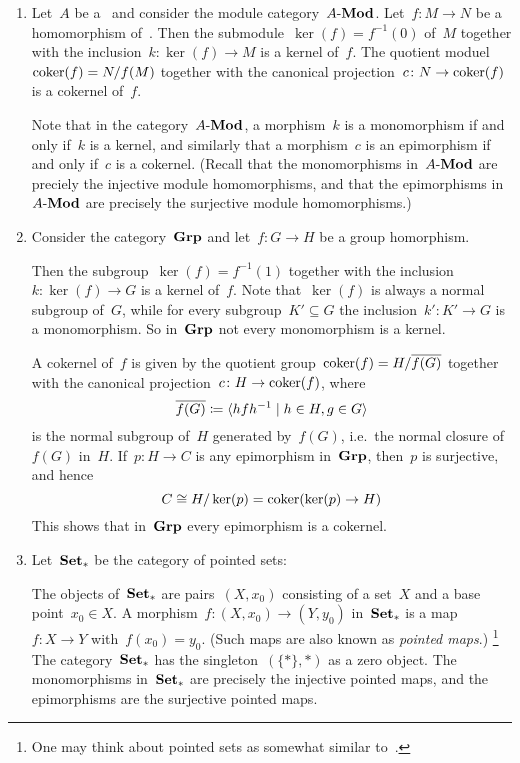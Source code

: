 \begin{example}
  \leavevmode
  \begin{enumerate}
    \item
      Let~$A$ be a~{\kalg} and consider the module category~$\text{$A$-$\mathbf{Mod}$}$.
      Let~$f \colon M \to N$ be a homomorphism of~{}.
      Then the submodule~$\ker(f) = f^{-1}(0)$ of~$M$ together with the inclusion~$k \colon \ker(f) \to M$ is a kernel of~$f$.
      The quotient moduel~$\operatorname{coker}(f) = N/f(M)$ together with the canonical projection~$c \colon N \to \operatorname{coker}(f)$ is a cokernel of~$f$.
      
      Note that in the category~$\text{$A$-$\mathbf{Mod}$}$, a morphism~$k$ is a monomorphism if and only if~$k$ is a kernel, and similarly that a morphism~$c$ is an epimorphism if and only if~$c$ is a cokernel.
      (Recall that the monomorphisms in~$\text{$A$-$\mathbf{Mod}$}$ are preciely the injective module homomorphisms, and that the epimorphisms in~$\text{$A$-$\mathbf{Mod}$}$ are precisely the surjective module homomorphisms.)
    \item
      Consider the category~$\mathbf{Grp}$ and let~$f \colon G \to H$ be a group homorphism.
      
      Then the subgroup~$\ker(f) = f^{-1}(1)$ together with the inclusion~$k \colon \ker(f) \to G$ is a kernel of~$f$.
      Note that~$\ker(f)$ is always a normal subgroup of~$G$, while for every subgroup~$K' \subseteq G$ the inclusion~$k' \colon K' \to G$ is a monomorphism.
      So in~$\mathbf{Grp}$ not every monomorphism is a kernel.
      
      A cokernel of~$f$ is given by the quotient group~$\operatorname{coker}(f) = H/\overline{f(G)}$ together with the canonical projection~$c \colon H \to \operatorname{coker}(f)$, where
      \[
                  \closure{f(G)}
        \defined  \gen{
                    h f h^{-1}
                  \suchthat
                    h \in H, g \in G
                  }
      \]
      is the normal subgroup of~$H$ generated by~$f(G)$, i.e.\ the normal closure of~$f(G)$ in~$H$.
      If~$p \colon H \to C$ is any epimorphism in~$\mathbf{Grp}$, then~$p$ is surjective, and hence
      \[
              C
        \cong H/\ker(p)
        =     \operatorname{coker}(\ker(p) \to H)
      \]
      This shows that in~$\mathbf{Grp}$ every epimorphism is a cokernel.
    \item
      Let~$\mathbf{Set}_*$ be the category of pointed sets:
      
      The objects of~$\mathbf{Set}_*$ are pairs~$(X,x_0)$ consisting of a set~$X$ and a base point~$x_0 \in X$.
      A morphism~$f \colon (X,x_0) \to (Y,y_0)$ in~$\mathbf{Set}_*$ is a map~$f \colon X \to Y$ with~$f(x_0) = y_0$.
      (Such maps are also known as \emph{pointed maps}.)%
      \footnote{One may think about pointed sets as somewhat similar to~.}
      The category~$\mathbf{Set}_*$ has the singleton~$(\{\ast\}, \ast)$ as a zero object.
      The monomorphisms in~$\mathbf{Set}_*$ are precisely the injective pointed maps, and the epimorphisms are the surjective pointed maps.
      

\end{enumerate}
\end{example}
